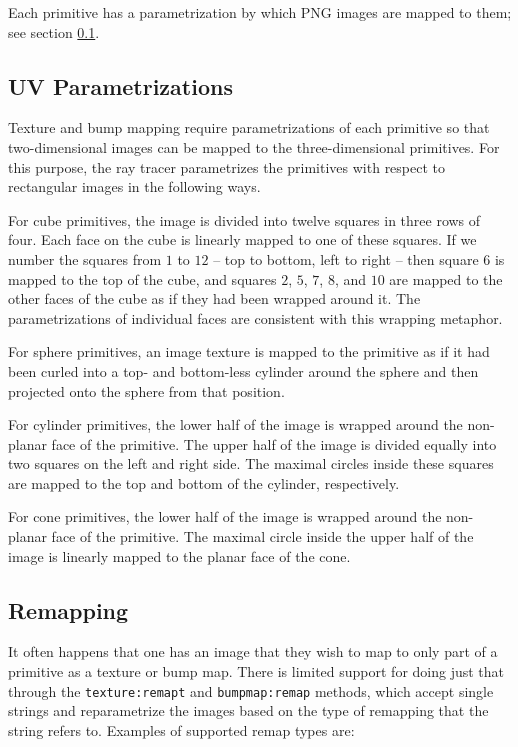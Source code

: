 \documentclass{article}
\begin{document}
Each primitive has a parametrization by which PNG images are mapped to them; see
section \ref{uv_parametrizations}.

\subsection{UV Parametrizations}
\label{uv_parametrizations}

Texture and bump mapping require parametrizations of each primitive so that
two-dimensional images can be mapped to the three-dimensional primitives. For
this purpose, the ray tracer parametrizes the primitives with respect to
rectangular images in the following ways.

For cube primitives, the image is divided into twelve squares in three rows of
four. Each face on the cube is linearly mapped to one of these squares. If we
number the squares from $1$ to $12$ -- top to bottom, left to right -- then
square $6$ is mapped to the top of the cube, and squares $2$, $5$, $7$, $8$, and
$10$ are mapped to the other faces of the cube as if they had been wrapped
around it. The parametrizations of individual faces are consistent with this
wrapping metaphor.

For sphere primitives, an image texture is mapped to the primitive as if it
had been curled into a top- and bottom-less cylinder around the sphere and then
projected onto the sphere from that position.

For cylinder primitives, the lower half of the image is wrapped around the
non-planar face of the primitive. The upper half of the image is divided equally
into two squares on the left and right side. The maximal circles inside these
squares are mapped to the top and bottom of the cylinder, respectively.

For cone primitives, the lower half of the image is wrapped around the
non-planar face of the primitive. The maximal circle inside the upper half of
the image is linearly mapped to the planar face of the cone.

\subsection{Remapping}
\label{remapping}

It often happens that one has an image that they wish to map to only part of a
primitive as a texture or bump map. There is limited support for doing just that
through the {\tt texture:remapt} and {\tt bumpmap:remap} methods, which accept
single strings and reparametrize the images based on the type of remapping that
the string refers to. Examples of supported remap types are:
\end{document}
